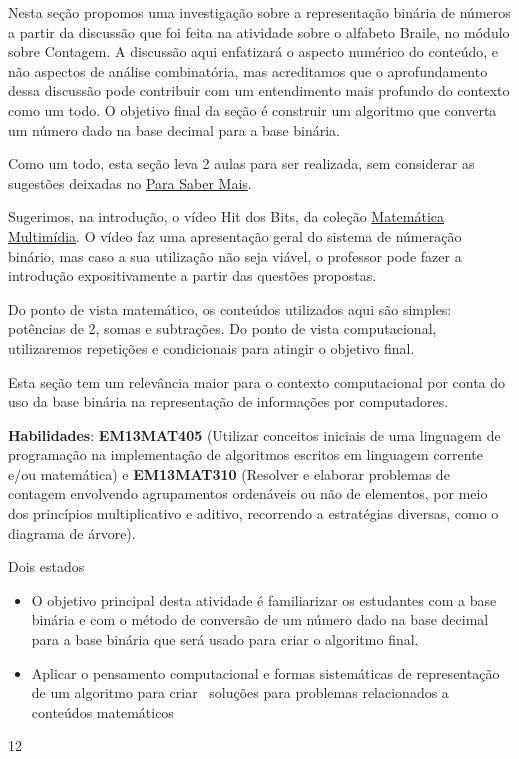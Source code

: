 \def\currentcolor{session1}
\begin{texto}
{
Nesta seção propomos uma investigação sobre a representação binária de números a partir da discussão que foi feita na atividade sobre o alfabeto Braile, no módulo sobre Contagem. A discussão aqui enfatizará o aspecto numérico do conteúdo, e não aspectos de análise combinatória, mas acreditamos que o aprofundamento dessa discussão pode contribuir com um entendimento mais profundo do contexto como um todo. O objetivo final da seção é construir um algoritmo que converta um número dado na base decimal para a base binária.

Como um todo, esta seção leva 2 aulas para ser realizada, sem considerar as sugestões deixadas no \hyperref[comp-know1]{Para Saber Mais}.

Sugerimos, na introdução, o vídeo Hit dos Bits, da coleção \href{https://m3.ime.unicamp.br/}{Matemática Multimídia}. O vídeo faz uma apresentação geral do sistema de númeração binário, mas caso a sua utilização não seja viável, o professor pode fazer a introdução expositivamente a partir das questões propostas.

Do ponto de vista matemático, os conteúdos utilizados aqui são simples: potências de 2, somas e subtrações. Do ponto de vista computacional, utilizaremos repetições e condicionais para atingir o objetivo final.

Esta seção tem um relevância maior para o contexto computacional por conta do uso da base binária na representação de informações por computadores.

\textbf{Habilidades}: \textbf{EM13MAT405} (Utilizar conceitos iniciais de uma linguagem de programação na implementação de algoritmos escritos em linguagem corrente e/ou matemática) e \textbf{EM13MAT310} (Resolver e elaborar problemas de contagem envolvendo agrupamentos ordenáveis ou não de elementos, por meio dos princípios multiplicativo e aditivo, recorrendo a estratégias diversas, como o diagrama de árvore).

}
\end{texto}
\clearmargin
\begin{objectives}{Dois estados}
{
\begin{itemize}
\item O objetivo principal desta atividade é familiarizar os estudantes com a base binária e com o método de conversão de um número dado na base decimal para a base binária que será usado para criar o algoritmo final.

\item Aplicar o pensamento computacional e formas sistemáticas de representação de um algoritmo para criar ~soluções para problemas relacionados a conteúdos matemáticos
\end{itemize}
}{1}{2}
\end{objectives}
